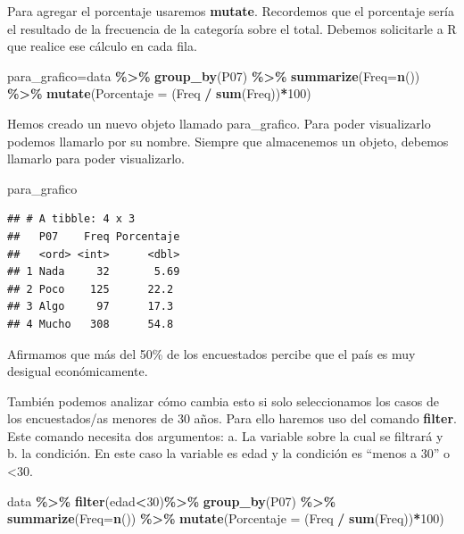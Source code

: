 \documentclass[
]{article}
\newenvironment{Shaded}{\begin{snugshade}}{\end{snugshade}}
\newcommand{\AttributeTok}[1]{\textcolor[rgb]{0.13,0.29,0.53}{#1}}
\newcommand{\DecValTok}[1]{\textcolor[rgb]{0.00,0.00,0.81}{#1}}
\newcommand{\FunctionTok}[1]{\textcolor[rgb]{0.13,0.29,0.53}{\textbf{#1}}}
\newcommand{\NormalTok}[1]{#1}
\newcommand{\OtherTok}[1]{\textcolor[rgb]{0.56,0.35,0.01}{#1}}
\newcommand{\SpecialCharTok}[1]{\textcolor[rgb]{0.81,0.36,0.00}{\textbf{#1}}}
\begin{document}
Para agregar el porcentaje usaremos \textbf{mutate}. Recordemos que el
porcentaje sería el resultado de la frecuencia de la categoría sobre el
total. Debemos solicitarle a R que realice ese cálculo en cada fila.

\begin{Shaded}
\begin{Highlighting}[]
\NormalTok{para\_grafico}\OtherTok{=}\NormalTok{data }\SpecialCharTok{\%\textgreater{}\%}
 \FunctionTok{group\_by}\NormalTok{(P07) }\SpecialCharTok{\%\textgreater{}\%}
 \FunctionTok{summarize}\NormalTok{(}\AttributeTok{Freq=}\FunctionTok{n}\NormalTok{()) }\SpecialCharTok{\%\textgreater{}\%}
 \FunctionTok{mutate}\NormalTok{(}\AttributeTok{Porcentaje =}\NormalTok{ (Freq }\SpecialCharTok{/} \FunctionTok{sum}\NormalTok{(Freq))}\SpecialCharTok{*}\DecValTok{100}\NormalTok{)}
\end{Highlighting}
\end{Shaded}

Hemos creado un nuevo objeto llamado para\_grafico. Para poder
visualizarlo podemos llamarlo por su nombre. Siempre que almacenemos un
objeto, debemos llamarlo para poder visualizarlo.

\begin{Shaded}
\begin{Highlighting}[]
\NormalTok{para\_grafico}
\end{Highlighting}
\end{Shaded}

\begin{verbatim}
## # A tibble: 4 x 3
##   P07    Freq Porcentaje
##   <ord> <int>      <dbl>
## 1 Nada     32       5.69
## 2 Poco    125      22.2 
## 3 Algo     97      17.3 
## 4 Mucho   308      54.8
\end{verbatim}

Afirmamos que más del 50\% de los encuestados percibe que el país es muy
desigual económicamente.

También podemos analizar cómo cambia esto si solo seleccionamos los
casos de los encuestados/as menores de 30 años. Para ello haremos uso
del comando \textbf{filter}. Este comando necesita dos argumentos: a. La
variable sobre la cual se filtrará y b. la condición. En este caso la
variable es edad y la condición es ``menos a 30'' o \textless30.

\begin{Shaded}
\begin{Highlighting}[]
\NormalTok{data }\SpecialCharTok{\%\textgreater{}\%}
  \FunctionTok{filter}\NormalTok{(edad}\SpecialCharTok{\textless{}}\DecValTok{30}\NormalTok{)}\SpecialCharTok{\%\textgreater{}\%}
  \FunctionTok{group\_by}\NormalTok{(P07) }\SpecialCharTok{\%\textgreater{}\%}
  \FunctionTok{summarize}\NormalTok{(}\AttributeTok{Freq=}\FunctionTok{n}\NormalTok{()) }\SpecialCharTok{\%\textgreater{}\%}
  \FunctionTok{mutate}\NormalTok{(}\AttributeTok{Porcentaje =}\NormalTok{ (Freq }\SpecialCharTok{/} \FunctionTok{sum}\NormalTok{(Freq))}\SpecialCharTok{*}\DecValTok{100}\NormalTok{)}
\end{Highlighting}
\end{Shaded}
\end{document}
